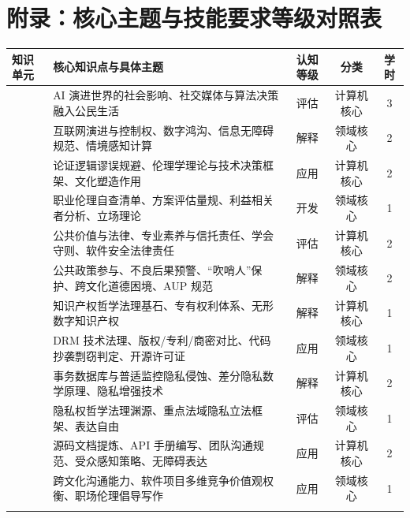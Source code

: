 \clearpage
\onecolumn
\section{附录：核心主题与技能要求等级对照表}

\noindent\begin{tabularx}{\textwidth}{p{} Y c c c}
\toprule
\textbf{知识单元} & \textbf{核心知识点与具体主题} & \textbf{认知等级} & \textbf{分类} & \textbf{学时} \\
\midrule
{} 
& AI 演进世界的社会影响、社交媒体与算法决策融入公民生活 & 评估 & 计算机核心 & 3 \\
& 互联网演进与控制权、数字鸿沟、信息无障碍规范、情境感知计算 & 解释 & 领域核心 & 2 \\
\midrule
{} 
& 论证逻辑谬误规避、伦理学理论与技术决策框架、文化塑造作用 & 应用 & 计算机核心 & 2 \\
& 职业伦理自查清单、方案评估量规、利益相关者分析、立场理论 & 开发 & 领域核心 & 1 \\
\midrule
{} 
& 公共价值与法律、专业素养与信托责任、学会守则、软件安全法律责任 & 评估 & 计算机核心 & 2 \\
& 公共政策参与、不良后果预警、“吹哨人”保护、跨文化道德困境、AUP 规范 & 解释 & 领域核心 & 2 \\
\midrule
{} 
& 知识产权哲学法理基石、专有权利体系、无形数字知识产权 & 解释 & 计算机核心 & 1 \\
& DRM 技术法理、版权/专利/商密对比、代码抄袭剽窃判定、开源许可证 & 应用 & 领域核心 & 1 \\
\midrule
{} 
& 事务数据库与普适监控隐私侵蚀、差分隐私数学原理、隐私增强技术 & 解释 & 计算机核心 & 2 \\
& 隐私权哲学法理渊源、重点法域隐私立法框架、表达自由 & 评估 & 领域核心 & 1 \\
\midrule
{} 
& 源码文档提炼、API 手册编写、团队沟通规范、受众感知策略、无障碍表达 & 应用 & 计算机核心 & 2 \\
& 跨文化沟通能力、软件项目多维竞争价值观权衡、职场伦理倡导写作 & 应用 & 领域核心 & 1 \\
\midrule
{} 

\end{tabularx}
